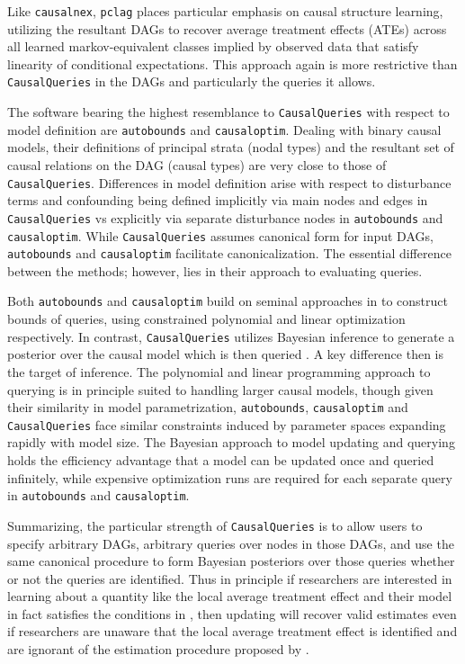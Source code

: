 \documentclass[
  11pt,
  article]{jss}
\begin{document}
Like \texttt{causalnex}, \texttt{pclag} places particular emphasis on
causal structure learning, utilizing the resultant DAGs to recover
average treatment effects (ATEs) across all learned markov-equivalent
classes implied by observed data that satisfy linearity of conditional
expectations. This approach again is more restrictive than
\texttt{CausalQueries} in the DAGs and particularly the queries it
allows.

The software bearing the highest resemblance to \texttt{CausalQueries}
with respect to model definition are \texttt{autobounds} and
\texttt{causaloptim}. Dealing with binary causal models, their
definitions of principal strata (nodal types) and the resultant set of
causal relations on the DAG (causal types) are very close to those of
\texttt{CausalQueries}. Differences in model definition arise with
respect to disturbance terms and confounding being defined implicitly
via main nodes and edges in \texttt{CausalQueries} vs explicitly via
separate disturbance nodes in \texttt{autobounds} and
\texttt{causaloptim}. While \texttt{CausalQueries} assumes canonical
form for input DAGs, \texttt{autobounds} and \texttt{causaloptim}
facilitate canonicalization. The essential difference between the
methods; however, lies in their approach to evaluating queries.

Both \texttt{autobounds} and \texttt{causaloptim} build on seminal
approaches in \citet{balke_bounds_1997} to construct bounds of queries,
using constrained polynomial and linear optimization respectively. In
contrast, \texttt{CausalQueries} utilizes Bayesian inference to generate
a posterior over the causal model which is then queried
\citep[consistent
with][]{chickering_clinicians_1996, zhang_partial_2022}. A key
difference then is the target of inference. The polynomial and linear
programming approach to querying is in principle suited to handling
larger causal models, though given their similarity in model
parametrization, \texttt{autobounds}, \texttt{causaloptim} and
\texttt{CausalQueries} face similar constraints induced by parameter
spaces expanding rapidly with model size. The Bayesian approach to model
updating and querying holds the efficiency advantage that a model can be
updated once and queried infinitely, while expensive optimization runs
are required for each separate query in \texttt{autobounds} and
\texttt{causaloptim}.

Summarizing, the particular strength of \texttt{CausalQueries} is to
allow users to specify arbitrary DAGs, arbitrary queries over nodes in
those DAGs, and use the same canonical procedure to form Bayesian
posteriors over those queries whether or not the queries are identified.
Thus in principle if researchers are interested in learning about a
quantity like the local average treatment effect and their model in fact
satisfies the conditions in \citet{angrist_identification_1996}, then
updating will recover valid estimates even if researchers are unaware
that the local average treatment effect is identified and are ignorant
of the estimation procedure proposed by
\citet{angrist_identification_1996}.
\end{document}
